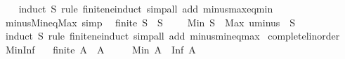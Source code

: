 \begin{isabellebody}
%
\isadelimproof
\ \ %
\endisadelimproof
%
\isatagproof
{}\isamarkupfalse%
\ {\isacharparenleft}{\kern0pt}induct\ S\ rule{\isacharcolon}{\kern0pt}\ finite{\isacharunderscore}{\kern0pt}ne{\isacharunderscore}{\kern0pt}induct{\isacharparenright}{\kern0pt}\ {\isacharparenleft}{\kern0pt}simp{\isacharunderscore}{\kern0pt}all\ add{\isacharcolon}{\kern0pt}\ minus{\isacharunderscore}{\kern0pt}max{\isacharunderscore}{\kern0pt}eq{\isacharunderscore}{\kern0pt}min{\isacharparenright}{\kern0pt}%
\endisatagproof
{\isafoldproof}%
%
\isadelimproof
\isanewline
%
\endisadelimproof
\isanewline
{}\isamarkupfalse%
\ minus{\isacharunderscore}{\kern0pt}Min{\isacharunderscore}{\kern0pt}eq{\isacharunderscore}{\kern0pt}Max\ {\isacharbrackleft}{\kern0pt}simp{\isacharbrackright}{\kern0pt}{\isacharcolon}{\kern0pt}\isanewline
\ \ {\isachardoublequoteopen}finite\ S\ {\isasymLongrightarrow}\ S\ {\isasymnoteq}\ {\isacharbraceleft}{\kern0pt}{\isacharbraceright}{\kern0pt}\ {\isasymLongrightarrow}\ {\isacharminus}{\kern0pt}\ Min\ S\ {\isacharequal}{\kern0pt}\ Max\ {\isacharparenleft}{\kern0pt}uminus\ {\isacharbackquote}{\kern0pt}\ S{\isacharparenright}{\kern0pt}{\isachardoublequoteclose}\isanewline
%
\isadelimproof
\ \ %
\endisadelimproof
%
\isatagproof
{}\isamarkupfalse%
\ {\isacharparenleft}{\kern0pt}induct\ S\ rule{\isacharcolon}{\kern0pt}\ finite{\isacharunderscore}{\kern0pt}ne{\isacharunderscore}{\kern0pt}induct{\isacharparenright}{\kern0pt}\ {\isacharparenleft}{\kern0pt}simp{\isacharunderscore}{\kern0pt}all\ add{\isacharcolon}{\kern0pt}\ minus{\isacharunderscore}{\kern0pt}min{\isacharunderscore}{\kern0pt}eq{\isacharunderscore}{\kern0pt}max{\isacharparenright}{\kern0pt}%
\endisatagproof
{\isafoldproof}%
%
\isadelimproof
\isanewline
%
\endisadelimproof
\isanewline
{}\isamarkupfalse%
\isanewline
\isanewline
{}\isamarkupfalse%
\ complete{\isacharunderscore}{\kern0pt}linorder\isanewline
{}\isanewline
\isanewline
{}\isamarkupfalse%
\ Min{\isacharunderscore}{\kern0pt}Inf{\isacharcolon}{\kern0pt}\isanewline
\ \ \ {\isachardoublequoteopen}finite\ A{\isachardoublequoteclose}\ \ {\isachardoublequoteopen}A\ {\isasymnoteq}\ {\isacharbraceleft}{\kern0pt}{\isacharbraceright}{\kern0pt}{\isachardoublequoteclose}\isanewline
\ \ \ {\isachardoublequoteopen}Min\ A\ {\isacharequal}{\kern0pt}\ Inf\ A{\isachardoublequoteclose}\isanewline
%
\isadelimproof
%
\endisadelimproof
%
\isatagproof
{}\isamarkupfalse%
\ {\isacharminus}{\kern0pt}\isanewline

\end{isabellebody}
